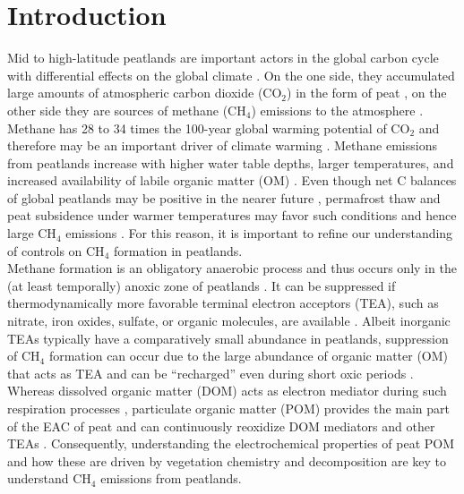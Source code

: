 \documentclass[alpha-refs, lineno]{wiley-article-rmd}
\begin{document}
\hypertarget{introduction}{%
\section{Introduction}\label{introduction}}

Mid to high-latitude peatlands are important actors in the global carbon cycle with differential effects on the global climate \autocite{Frolking.2011}. On the one side, they accumulated large amounts of atmospheric carbon dioxide (CO\(_2\)) in the form of peat \autocite{Limpens.2008}, on the other side they are sources of methane (CH\(_4\)) emissions to the atmosphere \autocite{Limpens.2008,Frolking.2011}.\\
Methane has 28 to 34 times the 100-year global warming potential of CO\(_2\) and therefore may be an important driver of climate warming \autocite{Myhre.2013}. Methane emissions from peatlands increase with higher water table depths, larger temperatures, and increased availability of labile organic matter (OM) \autocite{Moore.1989,Yavitt.1997,Limpens.2008}. Even though net C balances of global peatlands may be positive in the nearer future \autocite{Chaudhary.2020}, permafrost thaw and peat subsidence under warmer temperatures may favor such conditions and hence large CH\(_4\) emissions \autocite{Anisimov.2007,Koven.2011,Frolking.2011}. For this reason, it is important to refine our understanding of controls on CH\(_4\) formation in peatlands.\\
Methane formation is an obligatory anaerobic process and thus occurs only in the (at least temporally) anoxic zone of peatlands \autocite{Limpens.2008}. It can be suppressed if thermodynamically more favorable terminal electron acceptors (TEA), such as nitrate, iron oxides, sulfate, or organic molecules, are available \autocite{Blodau.2011,Klupfel.2014,Gao.2019}. Albeit inorganic TEAs typically have a comparatively small abundance in peatlands, suppression of CH\(_4\) formation can occur due to the large abundance of organic matter (OM) that acts as TEA \autocite{Gao.2019} and can be ``recharged'' even during short oxic periods \autocite{Klupfel.2014,Lau.2016,Walpen.2018b}. Whereas dissolved organic matter (DOM) acts as electron mediator during such respiration processes \autocite{Lau.2016,Gao.2019}, particulate organic matter (POM) provides the main part of the EAC of peat and can continuously reoxidize DOM mediators and other TEAs \autocite{Gao.2019,Blodau.2007}. Consequently, understanding the electrochemical properties of peat POM and how these are driven by vegetation chemistry and decomposition are key to understand CH\(_4\) emissions from peatlands.\\
\end{document}
